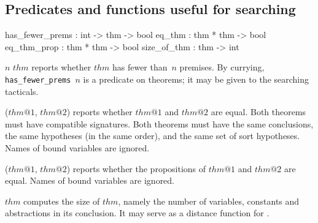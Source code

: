 \subsection{Predicates and functions useful for searching}
\begin{ttbox} 
has_fewer_prems : int -> thm -> bool
eq_thm          : thm * thm -> bool
eq_thm_prop     : thm * thm -> bool
size_of_thm     : thm -> int
\end{ttbox}
\begin{ttdescription}
\item[\ttindexbold{has_fewer_prems} $n$ $thm$] 
reports whether $thm$ has fewer than~$n$ premises.  By currying,
\hbox{\tt has_fewer_prems $n$} is a predicate on theorems; it may 
be given to the searching tacticals.

\item[\ttindexbold{eq_thm} ($thm@1$, $thm@2$)] reports whether $thm@1$ and
  $thm@2$ are equal.  Both theorems must have compatible signatures.  Both
  theorems must have the same conclusions, the same hypotheses (in the same
  order), and the same set of sort hypotheses.  Names of bound variables are
  ignored.
  
\item[\ttindexbold{eq_thm_prop} ($thm@1$, $thm@2$)] reports whether the
  propositions of $thm@1$ and $thm@2$ are equal.  Names of bound variables are
  ignored.

\item[\ttindexbold{size_of_thm} $thm$] 
computes the size of $thm$, namely the number of variables, constants and
abstractions in its conclusion.  It may serve as a distance function for 
. 
\end{ttdescription}


